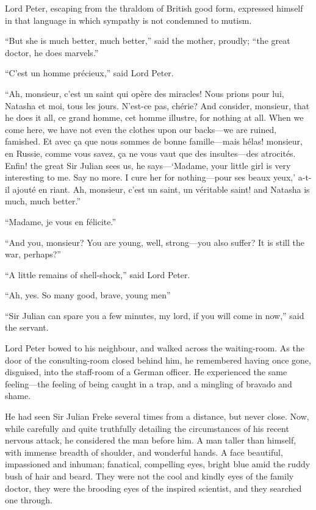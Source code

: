 Lord Peter, escaping from the thraldom of British good form, expressed himself in that language in which sympathy is not condemned to mutism.

\enquote{But she is much better, much better,} said the mother, proudly; \enquote{the great doctor, he does marvels.}

\enquote{C’est un homme précieux,} said Lord Peter.

\enquote{Ah, monsieur, c’est un saint qui opère des miracles! Nous prions pour lui, Natasha et moi, tous les jours. N’est-ce pas, chérie? And consider, monsieur, that he does it all, ce grand homme, cet homme illustre, for nothing at all. When we come here, we have not even the clothes upon our backs\allowbreak---\allowbreak we are ruined, famished. Et avec ça que nous sommes de bonne famille\allowbreak---\allowbreak mais hélas! monsieur, en Russie, comme vous savez, ça ne vous vaut que des insultes\allowbreak---\allowbreak des atrocités. Enfin! the great Sir Julian sees us, he says---\enquote{Madame, your little girl is very interesting to me. Say no more. I cure her for nothing\allowbreak---\allowbreak pour ses beaux yeux,} a-t-il ajouté en riant. Ah, monsieur, c’est un saint, un véritable saint! and Natasha is much, much better.}

\enquote{Madame, je vous en félicite.}

\enquote{And you, monsieur? You are young, well, strong\allowbreak---\allowbreak you also suffer? It is still the war, perhaps?}

\enquote{A little remains of shell-shock,} said Lord Peter.

\enquote{Ah, yes. So many good, brave, young men\longdash}

\enquote{Sir Julian can spare you a few minutes, my lord, if you will come in now,} said the servant.

Lord Peter bowed to his neighbour, and walked across the waiting-room. As the door of the consulting-room closed behind him, he remembered having once gone, disguised, into the staff-room of a German officer. He experienced the same feeling\allowbreak---\allowbreak the feeling of being caught in a trap, and a mingling of bravado and shame.

He had seen Sir Julian Freke several times from a distance, but never close. Now, while carefully and quite truthfully detailing the circumstances of his recent nervous attack, he considered the man before him. A man taller than himself, with immense breadth of shoulder, and wonderful hands. A face beautiful, impassioned and inhuman; fanatical, compelling eyes, bright blue amid the ruddy bush of hair and beard. They were not the cool and kindly eyes of the family doctor, they were the brooding eyes of the inspired scientist, and they searched one through.

